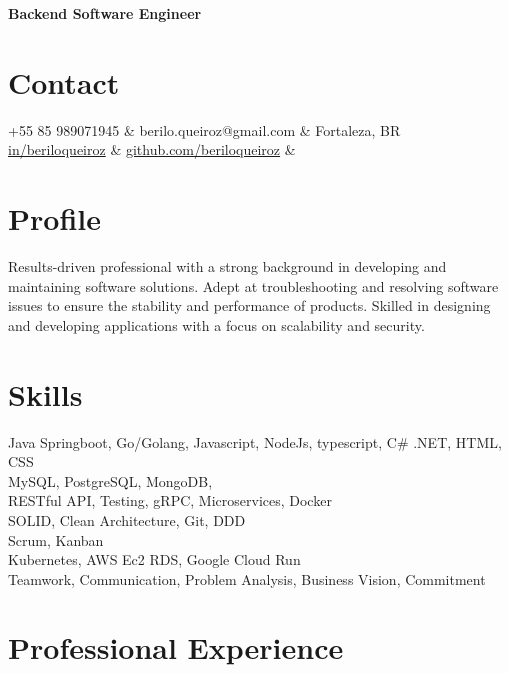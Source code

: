 \documentclass[11pt,a4paper,sans]{moderncv}
\begin{document}
\makecvtitle
\vspace*{-16mm}
\begin{center}\textbf{Backend Software Engineer}\end{center}

\section{Contact}{
  \begin{center}
	  \faMobile\enspace +55 85 989071945                                                                  & \enspace berilo.queiroz@gmail.com & \enspace\faHome\enspace Fortaleza, BR \\
	  \faLinkedin\enspace \color{blue} \href{https://www.linkedin.com/in/beriloqueiroz}{in/beriloqueiroz} &
	  \faGithub\enspace \color{blue} \href{https://github.com/beriloqueiroz}{github.com/beriloqueiroz}    & \enspace
  \end{center}
 }

\section{Profile}
 {
  Results-driven professional with a strong background in developing and maintaining software solutions. Adept at troubleshooting and resolving software issues to ensure the stability and performance of products. Skilled in designing and developing applications with a focus on scalability and security.
 }

\section{Skills}
 {
  Java Springboot, Go/Golang, Javascript, NodeJs, typescript, C\# .NET, HTML, CSS \\
  MySQL, PostgreSQL, MongoDB, \\
  RESTful API, Testing, gRPC, Microservices, Docker\\
  SOLID, Clean Architecture, Git, DDD \\
  Scrum, Kanban\\
  Kubernetes, AWS Ec2 RDS, Google Cloud Run\\
  Teamwork, Communication, Problem Analysis, Business Vision, Commitment\\
 }

\section{Professional Experience}
\end{document}
